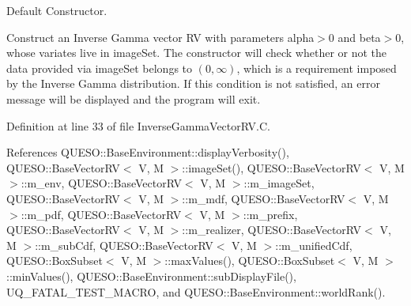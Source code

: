 Default Constructor. 

Construct an Inverse Gamma vector R\-V with parameters {\ttfamily alpha$>$0} and {\ttfamily beta$>$0}, whose variates live in {\ttfamily image\-Set}. The constructor will check whether or not the data provided via {\ttfamily image\-Set} belongs to $ (0, \infty)$, which is a requirement imposed by the Inverse Gamma distribution. If this condition is not satisfied, an error message will be displayed and the program will exit. 

Definition at line 33 of file Inverse\-Gamma\-Vector\-R\-V.\-C.



References Q\-U\-E\-S\-O\-::\-Base\-Environment\-::display\-Verbosity(), Q\-U\-E\-S\-O\-::\-Base\-Vector\-R\-V$<$ V, M $>$\-::image\-Set(), Q\-U\-E\-S\-O\-::\-Base\-Vector\-R\-V$<$ V, M $>$\-::m\-\_\-env, Q\-U\-E\-S\-O\-::\-Base\-Vector\-R\-V$<$ V, M $>$\-::m\-\_\-image\-Set, Q\-U\-E\-S\-O\-::\-Base\-Vector\-R\-V$<$ V, M $>$\-::m\-\_\-mdf, Q\-U\-E\-S\-O\-::\-Base\-Vector\-R\-V$<$ V, M $>$\-::m\-\_\-pdf, Q\-U\-E\-S\-O\-::\-Base\-Vector\-R\-V$<$ V, M $>$\-::m\-\_\-prefix, Q\-U\-E\-S\-O\-::\-Base\-Vector\-R\-V$<$ V, M $>$\-::m\-\_\-realizer, Q\-U\-E\-S\-O\-::\-Base\-Vector\-R\-V$<$ V, M $>$\-::m\-\_\-sub\-Cdf, Q\-U\-E\-S\-O\-::\-Base\-Vector\-R\-V$<$ V, M $>$\-::m\-\_\-unified\-Cdf, Q\-U\-E\-S\-O\-::\-Box\-Subset$<$ V, M $>$\-::max\-Values(), Q\-U\-E\-S\-O\-::\-Box\-Subset$<$ V, M $>$\-::min\-Values(), Q\-U\-E\-S\-O\-::\-Base\-Environment\-::sub\-Display\-File(), U\-Q\-\_\-\-F\-A\-T\-A\-L\-\_\-\-T\-E\-S\-T\-\_\-\-M\-A\-C\-R\-O, and Q\-U\-E\-S\-O\-::\-Base\-Environment\-::world\-Rank().


